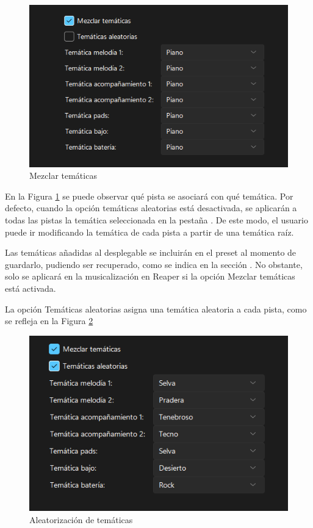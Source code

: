 \begin{figure}[h]
    \begin{center}
        \includegraphics[scale=0.7]{Imagenes/Bitmap/mixedThemes.png}
    \end{center}
    \caption{Mezclar temáticas}
    \label{fig:mixThemes}
\end{figure}

En la Figura \ref{fig:mixThemes} se puede observar qué pista se asociará con qué temática. Por defecto, cuando la opción temáticas aleatorias está desactivada, se aplicarán a todas las pistas la temática seleccionada en la pestaña \tematicTabName{}. De este modo, el usuario puede ir modificando la temática de cada pista a partir de una temática raíz.

Las temáticas añadidas al desplegable se incluirán en el preset al momento de guardarlo, pudiendo ser recuperado, como se indica en la sección . No obstante, solo se aplicará en la musicalización en Reaper si la opción Mezclar temáticas está activada.

La opción Temáticas aleatorias asigna una temática aleatoria a cada pista, como se refleja en la Figura \ref{fig:randomizeThemes}

\begin{figure}[h]
    \begin{center}
        \includegraphics[scale=0.7]{Imagenes/Bitmap/randomThemes.png}
    \end{center}
    \caption{Aleatorización de temáticas}
    \label{fig:randomizeThemes}
\end{figure}


